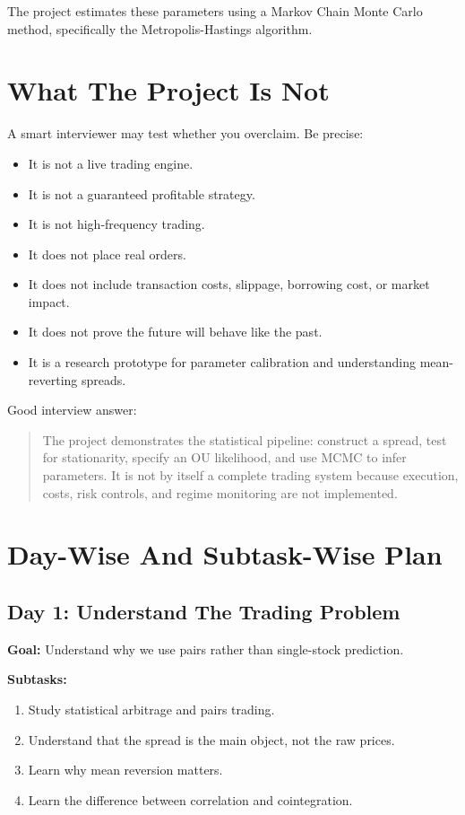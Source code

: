 \documentclass[11pt]{article}
\begin{document}
The project estimates these parameters using a Markov Chain Monte Carlo method,
specifically the Metropolis-Hastings algorithm.

\section{What The Project Is Not}

A smart interviewer may test whether you overclaim. Be precise:

\begin{itemize}
  \item It is not a live trading engine.
  \item It is not a guaranteed profitable strategy.
  \item It is not high-frequency trading.
  \item It does not place real orders.
  \item It does not include transaction costs, slippage, borrowing cost, or
  market impact.
  \item It does not prove the future will behave like the past.
  \item It is a research prototype for parameter calibration and understanding
  mean-reverting spreads.
\end{itemize}

Good interview answer:

\begin{quote}
The project demonstrates the statistical pipeline: construct a spread, test for
stationarity, specify an OU likelihood, and use MCMC to infer parameters. It is
not by itself a complete trading system because execution, costs, risk controls,
and regime monitoring are not implemented.
\end{quote}

\section{Day-Wise And Subtask-Wise Plan}

\subsection{Day 1: Understand The Trading Problem}

\textbf{Goal:} Understand why we use pairs rather than single-stock prediction.

\textbf{Subtasks:}

\begin{enumerate}
  \item Study statistical arbitrage and pairs trading.
  \item Understand that the spread is the main object, not the raw prices.
  \item Learn why mean reversion matters.
  \item Learn the difference between correlation and cointegration.
\end{enumerate}
\end{document}
